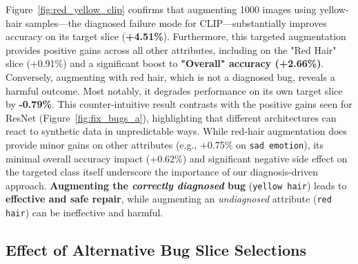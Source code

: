 \documentclass[10pt]{article} %
\begin{document}
Figure~\ref{fig:red_yellow_clip} confirms that augmenting 1000 images using yellow-hair samples—the diagnosed failure mode for CLIP—substantially improves accuracy on its target slice (\textbf{+4.51\%}). Furthermore, this targeted augmentation provides positive gains across all other attributes, including on the "Red Hair" slice (+0.91\%) and a significant boost to \textbf{"Overall" accuracy (+2.66\%)}. 
Conversely, augmenting with red hair, which is not a diagnosed bug, reveals a harmful outcome. Most notably, it degrades performance on its own target slice by \textbf{-0.79\%}. This counter-intuitive result contrasts with the positive gains seen for ResNet (Figure~\ref{fig:fix_bugs_a}), highlighting that different architectures can react to synthetic data in unpredictable ways. 
While red-hair augmentation does provide minor gains on other attributes (e.g., +0.75\% on \texttt{sad emotion}), its minimal overall accuracy impact (+0.62\%) and significant negative side effect on the targeted class itself underscore the importance of our diagnosis-driven approach. \textbf{Augmenting the \textit{correctly diagnosed} bug} (\texttt{yellow hair}) leads to \textbf{effective and safe repair}, while augmenting an \textit{undiagnosed} attribute (\texttt{red hair}) can be ineffective and harmful.

\vspace{10pt}
\subsection{Effect of Alternative Bug Slice Selections}



\begin{table}[t]
\centering
\footnotesize
\renewcommand{\arraystretch}{0.95}
\vspace{4pt}
\caption{Fix Rate (FR \%) for attribute-variant selections. Ours is the RH\_BS\_SE combination.}
\label{tab:base_and_attribute_variants}
\vspace{4pt}
\end{table}
\end{document}
